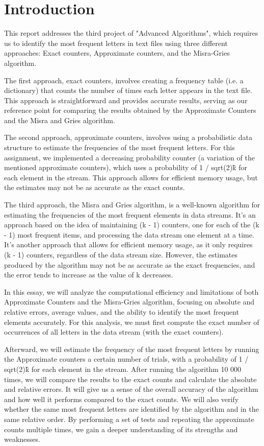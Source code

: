 \documentclass[]{revdetua}
\begin{document}
\section{Introduction}

This report addresses the third project of "Advanced Algorithms", which requires us to identify the most frequent letters in text files using three different approaches: Exact counters, Approximate counters, and the Misra-Gries algorithm.

The first approach, exact counters, involves creating a frequency table (i.e. a dictionary) that counts the number of times each letter appears in the text file. This approach is straightforward and provides accurate results, serving as our reference point for comparing the results obtained by the Approximate Counters and the Misra and Gries algorithm.

The second approach, approximate counters, involves using a probabilistic data structure to estimate the frequencies of the most frequent letters. For this assignment, we implemented a decreasing probability counter (a variation of the mentioned approximate counters), which uses a probability of 1 / sqrt(2)\^k for each element in the stream. This approach allows for efficient memory usage, but the estimates may not be as accurate as the exact counts.

The third approach, the Misra and Gries algorithm, is a well-known algorithm for estimating the frequencies of the most frequent elements in data streams. It's an approach based on the idea of maintaining (k - 1) counters, one for each of the (k - 1) most frequent items, and processing the data stream one element at a time. It's another approach that allows for efficient memory usage, as it only requires (k - 1) counters, regardless of the data stream size. However, the estimates produced by the algorithm may not be as accurate as the exact frequencies, and the error tends to increase as the value of k decreases.

In this essay, we will analyze the computational efficiency and limitations of both Approximate Counters and the Misra-Gries algorithm, focusing on absolute and relative errors, average values, and the ability to identify the most frequent elements accurately. For this analysis, we must first compute the exact number of occurrences of all letters in the data stream (with the exact counters).

Afterward, we will estimate the frequency of the most frequent letters by running the Approximate counters a certain number of trials, with a probability of 1 / sqrt(2)\^k for each element in the stream. After running the algorithm 10 000 times, we will compare the results to the exact counts and calculate the absolute and relative errors. It will give us a sense of the overall accuracy of the algorithm and how well it performs compared to the exact counts. We will also verify whether the same most frequent letters are identified by the algorithm and in the same relative order. By performing a set of tests and repeating the approximate counts multiple times, we gain a deeper understanding of its strengths and weaknesses.
\end{document}
